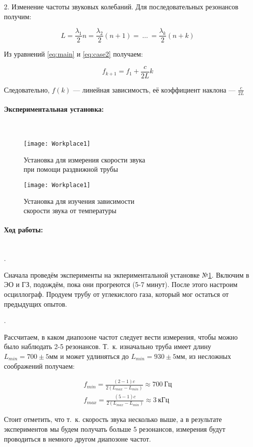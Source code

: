 \documentclass[a4paper, 12pt]{article}
\newcommand{\parag}[1]{\paragraph*{#1:}}
\newcounter{Points}
\newcommand{\point}{\arabic{Points}. \addtocounter{Points}{1}}
\begin{document}
2. Изменение частоты звуковых колебаний. Для последовательных резонансов получим:

\begin{equation} \label{eq:case2}
    L = \frac{\lambda_1}{2} n = \frac{\lambda_2}{2} (n + 1) = ~ \dots ~ = \frac{\lambda_k}{2} (n + k)
\end{equation}

Из уравнений \eqref{eq:main} и \eqref{eq:case2} получаем:

\[
    f_{k+1} = f_1 + \frac{c}{2L}k
\]

Следовательно, $f (k)$ --- линейная зависимость, её коэффициент наклона --- $\displaystyle \frac{c}{2L}$

\parag {Экспериментальная установка} ~

\begin{figure}[!h]
    \texttt{[image: Workplace1]}
    \caption{Установка для измерения скорости звука \\ при помощи раздвижной трубы} \label{work:1}
\end{figure}

\begin{figure}[!h]
    \texttt{[image: Workplace1]}
    \caption{Установка для изучения зависимости \\ скорости звука от температуры} \label{work:2}
\end{figure}

\parag {Ход работы} ~\\

\point Сначала проведём эксперименты на экпериментальной установке №\ref{work:1}. Включим в ЭО и ГЗ, подождём, пока они прогреются (5-7 минут). После этого настроим осциллограф. Продуем трубу от углекислого газа, который мог остаться от предыдущих опытов.

\point Рассчитаем, в каком диапозоне частот следует вести  измерения, чтобы можно было наблюдать 2-5 резонансов. Т.~к. изначально труба имеет длину $L_{min} = 700 \pm 5 \text {мм}$ и может удлиняться до $L_{min} = 930 \pm 5 \text {мм}$, из несложных соображений получаем:

\begin{align*}
    f_{min} = \frac{(2-1)c}{2(L_{max} - L_{min})} \approx 700 ~\text{Гц} \\
    f_{max} = \frac{(5-1)c}{2(L_{max} - L_{min})} \approx 3 ~\text{кГц}
\end{align*}

Стоит отметить, что т.~к. скорость звука несколько выше, а в результате экспериментов мы будем получать больше 5 резонансов, измерения будут проводиться в немного другом диапозоне частот.
\end{document}
